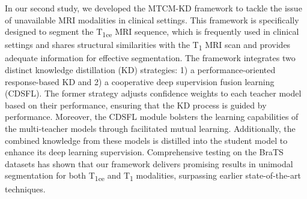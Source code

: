 In our second study, we developed the MTCM-KD framework to tackle the issue of unavailable MRI modalities in clinical settings. This framework is specifically designed to segment the T\textsubscript{1ce}  MRI sequence, which is frequently used in clinical settings and shares structural similarities with the T\textsubscript{1} MRI scan and provides adequate information for effective segmentation. The framework integrates two distinct knowledge distillation (KD) strategies: 1) a performance-oriented response-based KD and 2) a cooperative deep supervision fusion learning (CDSFL). The former strategy adjusts confidence weights to each teacher model based on their performance, ensuring that the KD process is guided by performance. Moreover, the CDSFL module bolsters the learning capabilities of the multi-teacher models through facilitated mutual learning. Additionally, the combined knowledge from these models is distilled into the student model to enhance its deep learning supervision. Comprehensive testing on the BraTS datasets has shown that our framework delivers promising results in unimodal segmentation for both T\textsubscript{1ce} and T\textsubscript{1} modalities, surpassing earlier state-of-the-art techniques.